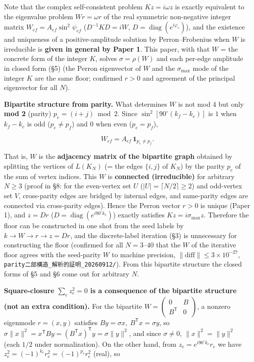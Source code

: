 \documentclass[
  a4paper,
]{ltjsarticle}
\begin{document}
Note that the complex self-consistent problem \(Kz=i\omega z\) is
exactly equivalent to the eigenvalue problem \(Wr=\omega r\) of the real
symmetric non-negative integer matrix \(W_{ef}=A_{ef}\sin^2\psi_{ef}\)
(\(D^{-1}KD=iW\), \(D=\operatorname{diag}(e^{i\varphi_e})\)), and the
existence and uniqueness of a positive-amplitude solution by
Perron--Frobenius when \(W\) is irreducible is \textbf{given in general
by Paper 1}. This paper, with that \(W\) = the concrete form of the
integer \(K\), solves \(\sigma=\rho(W)\) and each per-edge amplitude in
closed form (§5) (the Perron eigenvector of \(W\) and the
\(\sigma_{\max}\) mode of the integer \(K\) are the same floor;
confirmed \(r>0\) and agreement of the principal eigenvector for all
\(N\)).

\textbf{Bipartite structure from parity.} What determines \(W\) is not
mod 4 but only \textbf{mod 2} (parity) \(p_e=(i+j)\bmod2\). Since
\(\sin^2[90^\circ(k_f-k_e)]\) is \(1\) when \(k_f-k_e\) is odd
(\(p_e\neq p_f\)) and \(0\) when even (\(p_e=p_f\)),

\[W_{ef}=A_{ef}\,\mathbf 1_{p_e\neq p_f}.\]

That is, \(W\) is the \textbf{adjacency matrix of the bipartite graph}
obtained by splitting the vertices of \(L(K_N)\) (= the edges
\(\{i,j\}\) of \(K_N\)) by the parity \(p_e\) of the sum of vertex
indices. This \(W\) is \textbf{connected (irreducible)} for arbitrary
\(N\ge3\) (proof in §8: for the even-vertex set \(U\)
(\(|U|=\lceil N/2\rceil\ge2\)) and odd-vertex set \(V\), cross-parity
edges are bridged by internal edges, and same-parity edges are connected
via cross-parity edges). Hence the Perron vector \(r>0\) is unique
(Paper 1), and \(z=Dr\) (\(D=\operatorname{diag}(e^{i90^\circ k_e})\))
exactly satisfies \(Kz=i\sigma_{\max}z\). Therefore the floor can be
constructed in one shot from the seed labels by \(k\to W\to r\to z=Dr\),
and the discrete-label iteration (§3) is unnecessary for constructing
the floor (confirmed for all \(N=3\)--\(40\) that the \(W\) of the
iterative floor agrees with the seed-parity \(W\) to machine precision,
\(\|\text{diff}\|\le3\times10^{-27}\),
\texttt{parity二部構造\_解析的証明\_20260912/}). From this bipartite
structure the closed forms of §5 and §6 come out for arbitrary \(N\).

\textbf{Square-closure \(\sum_e z_e^2=0\) is a consequence of the
bipartite structure (not an extra condition).} For the bipartite
\(W=\begin{pmatrix}0&B\\B^{\mathsf T}&0\end{pmatrix}\), a nonzero
eigenmode \(r=(x,y)\) satisfies
\(By=\sigma x,\ B^{\mathsf T}x=\sigma y\), so
\(\sigma\|x\|^2=x^{\mathsf T}By=(B^{\mathsf T}x)^{\mathsf T}y=\sigma\|y\|^2\),
and since \(\sigma\neq0\), \(\|x\|^2=\|y\|^2\) (each \(1/2\) under
normalization). On the other hand, from \(z_e=e^{i90^\circ k_e}r_e\) we
have \(z_e^2=(-1)^{k_e}r_e^2=(-1)^{p_e}r_e^2\) (real), so
\end{document}
